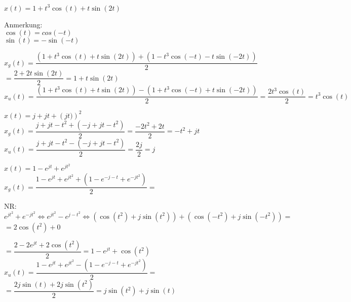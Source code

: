 \documentclass[a4paper, fontsize=10pt]{scrartcl}
\begin{document}
$x(t)=1+t^3\cos (t)+t\sin (2t)$\\
\begin{mdframed}
Anmerkung:\\
$\cos(t)=cos(-t)$\\
$\sin(t)=-\sin(-t)$\\
\end{mdframed} 

$x_g(t)=\dfrac{\left(1+t^3\cos (t)+t\sin (2t)\right)+\left(1-t^3\cos(-t)-t\sin (-2t)\right)}{2}$\\
$=\dfrac{2+2t\sin(2t)}{2}=1+t\sin(2t)$\\
$x_u(t)=\dfrac{\left(1+t^3\cos (t)+t\sin(2t)\right)-\left(1+t^3\cos(-t)+t\sin (-2t)\right)}{2}=\dfrac{2t^3\cos(t)}{2}=t^3\cos(t)$\bigskip

$x(t)=j+jt+\left(jt)\right)^2$\\
$x_g(t)=\dfrac{j+jt-t^2+\left(-j+jt-t^2\right)}{2}=\dfrac{-2t^2+2t}{2}=-t^2+jt$\\
$x_u(t)=\dfrac{j+jt-t^2-\left(-j+jt-t^2\right)}{2}=\dfrac{2j}{2}=j$\bigskip

$x(t)=1-e^{jt}+e^{jt^2}$\\
$x_g(t)=\dfrac{1-e^{jt}+e^{jt^2}+\left(1-e^{-j-t}+e^{-jt^2}\right)}{2}=$\\
\begin{mdframed}
NR: $e^{jt^2}+e^{-jt^2}\Leftrightarrow e^{jt^2}-e^{j-t^2}\Leftrightarrow \left(\cos(t^2)+j\sin(t^2)\right)+\left(\cos(-t^2)+j\sin(-t^2)\right)=$\\
$=2\cos(t^2)+0$
\end{mdframed} 
$=\dfrac{2-2e^{jt}+2\cos(t^2)}{2}=1-e^{jt}+\cos(t^2)$
$x_u(t)=\dfrac{1-e^{jt}+e^{jt^2}-\left(1-e^{-j-t}+e^{-jt^2}\right)}{2}=$\\
$=\dfrac{2j\sin(t)+2j\sin(t^2)}{2}=j\sin(t^2)+j\sin(t)$
\end{document}
